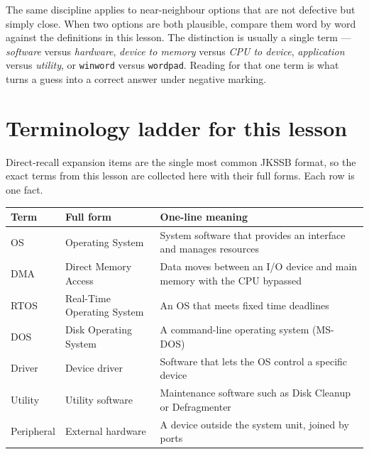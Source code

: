 The same discipline applies to near-neighbour options that are not defective
but simply close. When two options are both plausible, compare them word by
word against the definitions in this lesson. The distinction is usually a
single term --- \emph{software} versus \emph{hardware}, \emph{device to
memory} versus \emph{CPU to device}, \emph{application} versus
\emph{utility}, or \texttt{winword} versus \texttt{wordpad}. Reading for that
one term is what turns a guess into a correct answer under negative marking.

\section{Terminology ladder for this lesson}
Direct-recall expansion items are the single most common JKSSB format, so the
exact terms from this lesson are collected here with their full forms. Each
row is one fact.

\begin{center}
\begin{tabular}{p{}p{}p{}}
\toprule
\textbf{Term} & \textbf{Full form} & \textbf{One-line meaning} \\
\midrule
OS & Operating System & System software that provides an interface and manages resources \\
DMA & Direct Memory Access & Data moves between an I/O device and main memory with the CPU bypassed \\
RTOS & Real-Time Operating System & An OS that meets fixed time deadlines \\
DOS & Disk Operating System & A command-line operating system (MS-DOS) \\
Driver & Device driver & Software that lets the OS control a specific device \\
Utility & Utility software & Maintenance software such as Disk Cleanup or Defragmenter \\
Peripheral & External hardware & A device outside the system unit, joined by ports \\
\bottomrule
\end{tabular}
\end{center}

